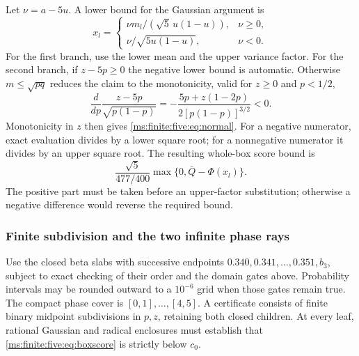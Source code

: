 Let $\nu=a-5u$. A lower bound for the Gaussian argument is
\begin{equation}\label{ms:finite:five:eq:normal}
 x_l=\begin{cases}
 \nu m_l/(\sqrt5\,u(1-u)),&\nu\ge0,\\
 \nu/\sqrt{5u(1-u)},&\nu<0.
 \end{cases}
\end{equation}
For the first branch, use the lower mean and the upper variance factor.
For the second branch, if $z-5p\ge0$ the negative lower bound is
automatic. Otherwise $m\le\sqrt{pq}$ reduces the claim to the
monotonicity, valid for $z\ge0$ and $p<1/2$,
\[
 \frac{d}{dp}\frac{z-5p}{\sqrt{p(1-p)}}
 =-\frac{5p+z(1-2p)}{2[p(1-p)]^{3/2}}<0.
\]
Monotonicity in $z$ then gives \eqref{ms:finite:five:eq:normal}.
For a negative numerator, exact evaluation divides by a lower square
root; for a nonnegative numerator it divides by an upper square root.
The resulting whole-box score bound is
\begin{equation}\label{ms:finite:five:eq:boxscore}
 \frac{\sqrt5}{477/400}\max\{0,\bar Q-\Phi(x_l)\}.
\end{equation}
The positive part must be taken before an upper-factor substitution;
otherwise a negative difference would reverse the required bound.

\subsubsection{Finite subdivision and the two infinite phase rays}

Use the closed beta slabs with successive endpoints
$0.340,0.341,\ldots,0.351,b_3$, subject to exact checking of their
order and the domain gates above. Probability intervals may be rounded
outward to a $10^{-6}$ grid when those gates remain true. The compact
phase cover is $[0,1],\ldots,[4,5]$. A certificate consists of finite
binary midpoint subdivisions in $p,z$, retaining both closed children.
At every leaf, rational Gaussian and radical enclosures must establish
that \eqref{ms:finite:five:eq:boxscore} is strictly below $c_0$.

